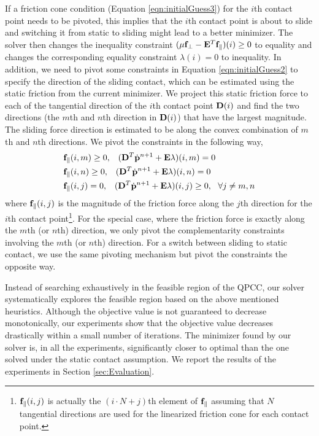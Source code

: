 If a friction cone condition (Equation \ref{eqn:initialGuess3}) for the
$i$th contact point needs to be pivoted, this implies that the $i$th contact point is about to slide and switching it from static to sliding might lead to a better minimizer. The solver then changes the inequality constraint $(\mu \mathbf{f}_{\perp} - \mathbf{E}^T \mathbf{f}_{\parallel})(i)\geq 0$ to equality and changes the corresponding equality constraint $\lambda(i)=0$ to inequality. In addition, we need to pivot some constraints in Equation \ref{eqn:initialGuess2} to specify the direction of the sliding contact, which can be estimated using the static friction from the current minimizer. We project this static friction force to each of the tangential direction of the $i$th contact point $\mathbf{D}(i)$ and find the two directions (the $m$th and $n$th direction in $\mathbf{D}(i)$) that have the largest magnitude. The sliding force direction is estimated to be along the convex combination of $m$th and $n$th directions. We pivot the constraints in the following way,
\begin{align}
& \mathbf{f}_{\parallel}(i, m)\geq 0, \;\;\; (\mathbf{D}^T \dot{\mathbf{p}}^{n+1} + \mathbf{E} \lambda)(i, m) = 0 \nonumber \\
& \mathbf{f}_{\parallel}(i, n)\geq 0, \;\;\; (\mathbf{D}^T \dot{\mathbf{p}}^{n+1} + \mathbf{E} \lambda)(i, n) = 0\nonumber \\
& \mathbf{f}_{\parallel}(i, j) = 0, \;\;\;(\mathbf{D}^T \dot{\mathbf{p}}^{n+1} + \mathbf{E} \lambda)(i, j) \geq 0, ~~\forall j \neq m, n\nonumber
\label{eqn:staticSlidePivot}
\end{align}
where $\mathbf{f}_{\parallel}(i, j)$ is the magnitude of the friction force
along the $j$th direction for the $i$th contact
point\footnote{$\mathbf{f}_{\parallel}(i, j)$ is actually the $(i\cdot N+j)$th
element of $\mathbf{f}_{\parallel}$ assuming that $N$ tangential directions
are used for the linearized friction cone for each contact point.}. For
the special case, where the friction force is exactly along the $m$th (or
$n$th) direction, we only pivot the complementarity constraints involving
the $m$th (or $n$th) direction. For a switch between sliding to static
contact, we use the same pivoting mechanism but pivot the constraints the
opposite way.

Instead of searching exhaustively in the feasible region of the QPCC, our
solver systematically explores the feasible region based on the above
mentioned heuristics. Although the objective value is not guaranteed to
decrease monotonically, our experiments show that the objective value
decreases drastically within a small number of iterations. The minimizer
found by our solver is, in all the experiments, significantly closer to
optimal than the one solved under the static contact assumption. We report the
results of the experiments in Section \ref{sec:Evaluation}.

